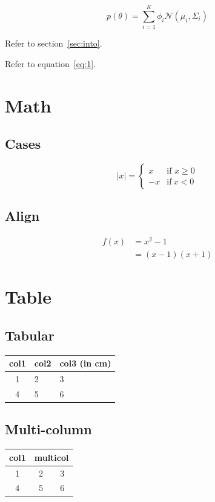 \documentclass{article}
\begin{document}
\begin{equation}
\label{eq:1}
    p(\theta) = \sum_{i=1}^K \phi_{i} \mathcal{N}(\mu_i, \Sigma_i)
\end{equation}

Refer to section~\ref{sec:into}.

Refer to equation~\eqref{eq:1}.

\section{Math}
\subsection{Cases}
\begin{equation*}
    |x| = 
    \begin{cases}
    x & \text{if }x \geq 0 \\
    -x & \text{if}\ x < 0
    \end{cases}
\end{equation*}

\subsection{Align}
\begin{align}
    f(x) &= x^2-1 \nonumber \\
     &= (x-1)(x+1)
\end{align}

\section{Table}
\subsection{Tabular}
\begin{tabular}{|c|l|p{1cm}|}
\hline
col1 & col2 & col3 (in cm) \\
\hline
1 & 2 & 3\\
\hline
4 & 5 & 6 \\
\hline
\end{tabular}

\subsection{Multi-column}

\begin{tabular}{|c|c|c|}
\hline
col1 & \multicolumn{2}{|c|}{multicol} \\
\hline
1 & 2 & 3\\
\hline
4 & 5 & 6 \\
\hline
\end{tabular}
\end{document}
